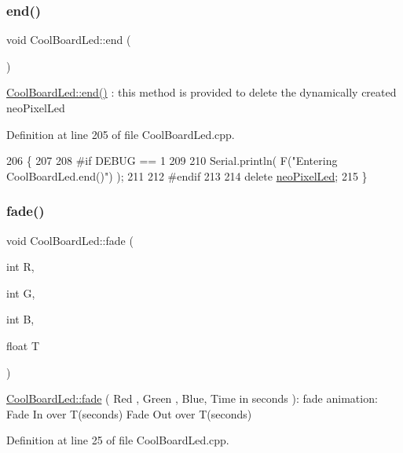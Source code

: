 \subsubsection{\texorpdfstring{end()}{end()}}
{\footnotesize\ttfamily void Cool\+Board\+Led\+::end (\begin{DoxyParamCaption}{ }\end{DoxyParamCaption})}

\hyperlink{class_cool_board_led_a69f323359e0c9f797422f2152b5d41ef}{Cool\+Board\+Led\+::end()} \+: this method is provided to delete the dynamically created neo\+Pixel\+Led 

Definition at line 205 of file Cool\+Board\+Led.\+cpp.


\begin{DoxyCode}
206 \{
207 
208 \textcolor{preprocessor}{#if DEBUG == 1 }
209     
210     Serial.println( F(\textcolor{stringliteral}{"Entering CoolBoardLed.end()"}) );
211 
212 \textcolor{preprocessor}{#endif}
213 
214     \textcolor{keyword}{delete} \hyperlink{class_cool_board_led_ac2c13fa462a010cd9242bf297c013923}{neoPixelLed};
215 \}
\end{DoxyCode}
\mbox{\label{class_cool_board_led_af1cacbaa88db8bcf6042c1083ba41155}} 
\subsubsection{\texorpdfstring{fade()}{fade()}}
{\footnotesize\ttfamily void Cool\+Board\+Led\+::fade (\begin{DoxyParamCaption}\item[{int}]{R,  }\item[{int}]{G,  }\item[{int}]{B,  }\item[{float}]{T }\end{DoxyParamCaption})}

\hyperlink{class_cool_board_led_af1cacbaa88db8bcf6042c1083ba41155}{Cool\+Board\+Led\+::fade} ( Red , Green , Blue, Time in seconds )\+: fade animation\+: Fade In over T(seconds) Fade Out over T(seconds) 

Definition at line 25 of file Cool\+Board\+Led.\+cpp.


